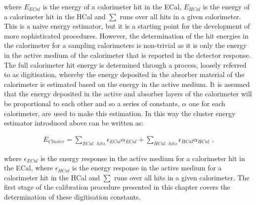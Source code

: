 \noindent where $E_{ECal}$ is the energy of a calorimeter hit in the ECal, $E_{HCal}$ is the energy of a calorimeter hit in the HCal and $\sum$ runs over all hits in a given calorimeter.  This is a naive energy estimator, but it is a starting point for the development of more sophisticated procedures.  However, the determination of the hit energies in the calorimeter for a sampling calorimeters is non-trivial as it is only the energy in the active medium of the calorimeter that is reported in the detector response.  The full calorimeter hit energy is determined through a process, loosely referred to as digitisation, whereby the energy deposited in the absorber material of the calorimeter is estimated based on the energy in the active medium.  It is assumed that the energy deposited in the active and absorber layers of the calorimeter will be proportional to each other and so a series of constants, $\alpha$ one for each calorimeter, are used to make this estimation.  In this way the cluster energy estimator introduced above can be written as:

\begin{equation}
\begin{aligned}
E_{Cluster} = \sum_{ECal \text{ } hits} \epsilon_{ECal} \alpha_{ECal} + \sum_{HCal \text{ } hits} \epsilon_{HCal} \alpha_{HCal} \text{ ,}
\end{aligned}
\end{equation}

\noindent where $\epsilon_{ECal}$ is the energy response in the active medium for a calorimeter hit in the ECal, where $\epsilon_{HCal}$ is the energy response in the active medium for a calorimeter hit in the HCal and $\sum$ runs over all hits in a given calorimeter.  The first stage of the calibration procedure presented in this chapter covers the determination of these digitisation constants.  

